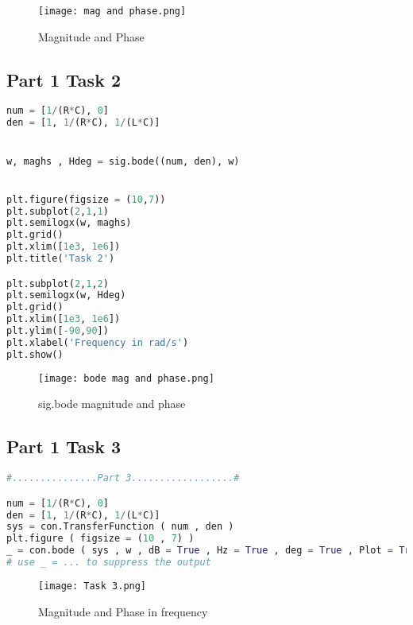 \documentclass[11pt,a4]{report}
\begin{document}
\begin{figure}[h!]
    \begin{center}
  \caption{Magnitude and Phase}
  \texttt{[image: mag and phase.png]}
\end{center}
\end{figure}

\subsection{Part 1 Task 2}

\begin{lstlisting}[language=Python]
num = [1/(R*C), 0]
den = [1, 1/(R*C), 1/(L*C)]


w, maghs , Hdeg = sig.bode((num, den), w)


plt.figure(figsize = (10,7))
plt.subplot(2,1,1)
plt.semilogx(w, maghs)
plt.grid()
plt.xlim([1e3, 1e6])
plt.title('Task 2')

plt.subplot(2,1,2)
plt.semilogx(w, Hdeg)
plt.grid()
plt.xlim([1e3, 1e6])
plt.ylim([-90,90])
plt.xlabel('Frequency in rad/s')
plt.show()
\end{lstlisting}

\begin{figure}[h!]
    \begin{center}
  \caption{sig.bode magnitude and phase}
  \texttt{[image: bode mag and phase.png]}
\end{center}
\end{figure}
\newpage


\subsection{Part 1 Task 3}

\begin{lstlisting}[language=Python]
#...............Part 3..................#

num = [1/(R*C), 0]
den = [1, 1/(R*C), 1/(L*C)]
sys = con.TransferFunction ( num , den )
plt.figure ( figsize = (10 , 7) )
_ = con.bode ( sys , w , dB = True , Hz = True , deg = True , Plot = True )
# use _ = ... to suppress the output
\end{lstlisting}


\begin{figure}[h!]
    \begin{center}
  \caption{Magnitude and Phase in frequency}
  \texttt{[image: Task 3.png]}
\end{center}
\end{figure}
\end{document}

